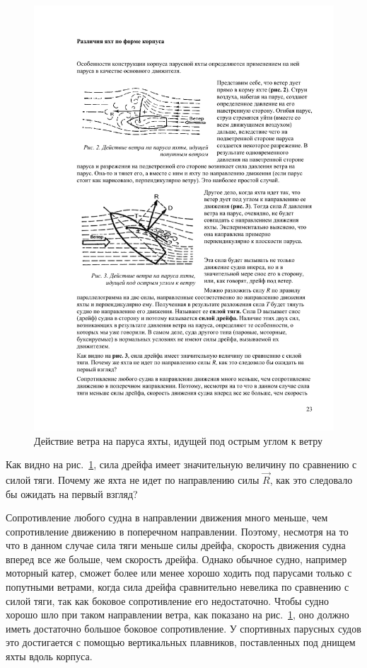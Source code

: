 \documentclass[a4paper, 12pt, twoside, final]{scrbook}
\begin{document}
\begin{figure}%
\centering
\includegraphics{Deystvie_vetra_ostryy_ugol}
\protect\caption{\label{fig:Deystvie_vetra_ostryy_ugol}Действие
ветра на паруса яхты, идущей под острым углом к ветру}
\end{figure}%

Как видно на рис.~\ref{fig:Deystvie_vetra_ostryy_ugol},
сила дрейфа имеет значительную величину по сравнению с силой тяги.
Почему же яхта не идет по направлению силы $\overrightarrow{R}$, как это следовало
бы ожидать на первый взгляд?

Сопротивление любого судна в направлении движения много меньше, чем
сопротивление движению в поперечном направлении. Поэтому, несмотря
на то что в данном случае сила тяги меньше силы дрейфа, скорость движения
судна вперед все же больше, чем скорость дрейфа. Однако обычное судно,
например моторный катер, сможет более или менее хорошо ходить под
парусами только с попутными ветрами, когда сила дрейфа сравнительно
невелика по сравнению с силой тяги, так как боковое сопротивление
его недостаточно. Чтобы судно хорошо шло при таком направлении ветра,
как показано на рис.~\ref{fig:Deystvie_vetra_ostryy_ugol},
оно должно иметь достаточно большое боковое сопротивление. У спортивных
парусных судов это достигается с помощью вертикальных плавников, поставленных
под днищем яхты вдоль корпуса.
\end{document}
